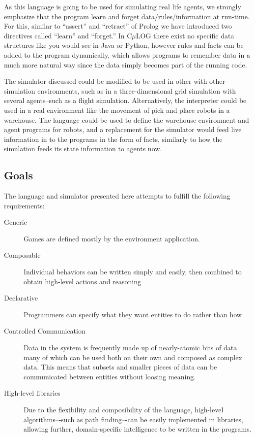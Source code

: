 \documentclass[onecolumn,titlepage]{article}
\begin{document}
As this language is going to be used for simulating real life agents,
we strongly emphasize that the program learn and forget
data/rules/information at run-time. For this, similar to ``assert'' and
``retract'' of Prolog we have introduced two directives called ``learn''
and ``forget.'' In C$\mu$LOG there exist no specific data structures like
you would see in Java or Python, however rules and facts can be added
to the program dynamically, which allows programs to remember data in
a much more natural way since the data simply becomes part of the
running code. 

The simulator discussed could be modified to be used in other
with other simulation environments, such as in a three-dimensional grid
simulation with several agents--such as a flight simulation. Alternatively,
the interpreter could be used in a real environment like the movement
of pick and
place robots in a warehouse. The language could be used to define the
warehouse environment and agent programs for robots, and a replacement
for the simulator would feed live information in to the programs in
the form of facts, similarly to how the simulation feeds its state
information to agents now.

\subsection{Goals}

The language and simulator presented here attempts to fulfill the
following requirements:
\begin{description}
  \item[Generic] Games are defined mostly by the environment
    application.
    
  \item[Composable] Individual behaviors can be written simply and
    easily, then combined to obtain high-level actions and reasoning
    
  \item[Declarative] Programmers can specify what they want
    entities to do rather than how

  \item[Controlled Communication] Data in the system is frequently
    made up of nearly-atomic bits of data many of which can be used
    both on their own and composed as complex data. This means that
    subsets and smaller pieces of data can be communicated between
    entities without loosing meaning.

  \item[High-level libraries] Due to the flexibility and composibility
    of the language, high-level
    algorithms–-such as path finding–-can be easily implemented in
    libraries, allowing further, domain-specific intelligence to be
    written in the programs.
\end{description}
\end{document}

